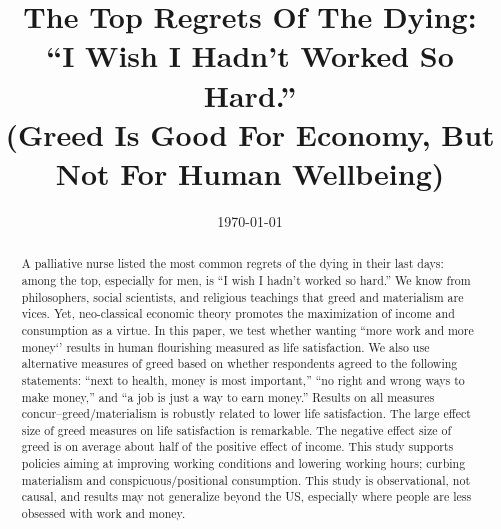 \documentclass[10pt, letterpaper]{article}
\date{{}\today \hspace{.2in}\xxivtime}
\title{The Top Regrets Of The Dying:\\ ``I Wish I Hadn't Worked So Hard.''\\
  (Greed Is Good For Economy, But Not For Human Wellbeing) %
}
\author{
}
\begin{document}


\maketitle
\vspace{-.4in}
\begin{center}

\end{center}


\begin{abstract}
\noindent A palliative nurse listed the most common regrets of the dying in
their last days: among the top, especially for men, is ``I wish I hadn't worked so hard.'' We know from philosophers, social scientists, and religious teachings that greed and materialism are vices. Yet, neo-classical economic theory promotes the maximization of income and consumption as a virtue.  
%
In this paper, we test whether wanting ``more work and more money`' results in human flourishing measured as life satisfaction. We also use alternative measures of greed based on whether respondents agreed to the following statements: ``next to health, money is most important,'' ``no right and wrong ways to make money,'' and ``a job is just a way to earn money.'' Results on all measures concur--greed/materialism is
robustly related to lower life satisfaction.
%
The large effect size of greed measures on life satisfaction  is remarkable. The negative effect size of greed is on average about half of the positive effect of income.
%
This study supports policies aiming at improving working conditions and lowering working hours; curbing materialism and
conspicuous/positional consumption. 
%
This study is observational, not causal, and results may not generalize beyond the US, especially where people are less obsessed with work and money.  
\end{abstract}
\vspace{.15in} 
\vspace{.25in} 
\end{document}
